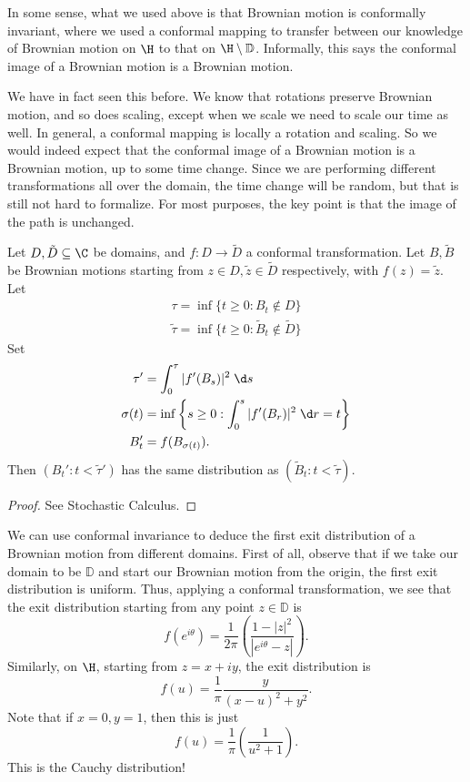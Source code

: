 \documentclass[a4paper]{article}
\renewcommand\D{\mathbb{D}}
\begin{document}
In some sense, what we used above is that Brownian motion is conformally invariant, where we used a conformal mapping to transfer between our knowledge of Brownian motion on $\H$ to that on $\H \setminus \D$. Informally, this says the conformal image of a Brownian motion is a Brownian motion.

We have in fact seen this before. We know that rotations preserve Brownian motion, and so does scaling, except when we scale we need to scale our time as well. In general, a conformal mapping is locally a rotation and scaling. So we would indeed expect that the conformal image of a Brownian motion is a Brownian motion, up to some time change. Since we are performing different transformations all over the domain, the time change will be random, but that is still not hard to formalize. For most purposes, the key point is that the image of the path is unchanged.


\begin{thm}
  Let $D, \tilde{D} \subseteq \C$ be domains, and $f: D \to \tilde{D}$ a conformal transformation. Let $B, \tilde{B}$ be Brownian motions starting from $z \in D, \tilde{z} \in \tilde{D}$ respectively, with $f(z) = \tilde{z}$. Let
  \begin{align*}
    \tau = \inf\{t \geq 0: B_t \not \in D\}\\
    \tilde{\tau} = \inf\{t \geq 0: \tilde{B}_t \not \in \tilde{D}\}
  \end{align*}
  Set
  \begin{align*}
    \tau' &= \int_0^\tau |f'(B_s)|^2\;\d s\\
    \sigma(t) &= \inf\left\{s \geq 0 : \int_0^s |f'(B_r)|^2\;\d r = t\right\}\\
    B_t' &= f(B_{\sigma(t)}).
  \end{align*}
  Then $(B_t' : t < \tilde{\tau}')$ has the same distribution as $(\tilde{B}_t: t < \tilde{\tau})$.
\end{thm}

\begin{proof}
  See Stochastic Calculus.
\end{proof}

\begin{eg}
  We can use conformal invariance to deduce the first exit distribution of a Brownian motion from different domains. First of all, observe that if we take our domain to be $\D$ and start our Brownian motion from the origin, the first exit distribution is uniform. Thus, applying a conformal transformation, we see that the exit distribution starting from any point $z \in \D$ is
  \[
    f(e^{i\theta}) = \frac{1}{2\pi}\left(\frac{1 - |z|^2}{ |e^{i\theta} - z|}\right).
  \]
  Similarly, on $\H$, starting from $z = x + iy$, the exit distribution is
  \[
    f(u) = \frac{1}{\pi} \frac{y}{(x - u)^2 + y^2}.
  \]
  Note that if $x = 0, y = 1$, then this is just
  \[
    f(u) = \frac{1}{\pi}\left(\frac{1}{u^2 + 1}\right).
  \]
  This is the Cauchy distribution!
\end{eg}
\end{document}
